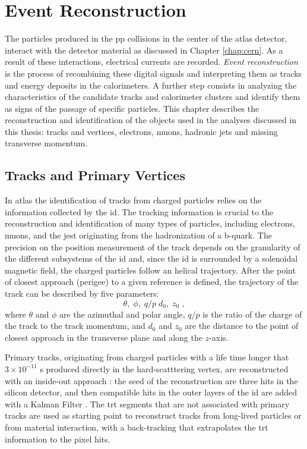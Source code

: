 \chapter{Event Reconstruction}
\label{sec:event:reco}

The particles produced in the \gls{pp} collisions in the center of the \gls{atlas} detector, interact with the detector material as discussed in Chapter \ref{chap:cern}. As a result of these interactions, electrical currents are recorded. \textit{Event reconstruction} is the process of recombining these digital signals and interpreting them as tracks and energy deposits in the calorimeters. A further step consists in analyzing the characteristics of the candidate tracks and calorimeter clusters and identify them as signs of the passage of specific particles.
This chapter describes the reconstruction and identification of the objects used in the analyses discussed in this thesis: tracks and vertices, electrons, muons, hadronic jets and missing transverse momentum. 


\section{Tracks and Primary Vertices}
\label{sec:reco:tracks}

In \gls{atlas} the identification of tracks from charged particles relies on the information collected by the \gls{id}. The tracking information is crucial to the reconstruction and identification of many types of particles, including electrons, muons, and the jest originating from the hadronization of a b-quark. The precision on the position measurement of the track depends on the granularity of the different subsystems of the \gls{id} and, since the \gls{id} is surrounded by a solenoidal magnetic field, the charged particles follow an helical trajectory. After the point of closest approach (perigee) to a given reference is defined, the trajectory of the track can be described by five parameters: 
\begin{equation}
\theta, \; \phi, \; q/p \; d_0, \; z_0 \;,
\end{equation}
\noindent where $\theta$ and $\phi$ are the azimuthal and polar angle, $q/p$ is the ratio of the charge of the track to the track momentum, and $d_0$ and $z_0$ are the distance to the point of closest approach in the transverse plane and along the $z$-axis. 

Primary tracks, originating from charged particles with a life time longer that $3 \times 10^{-11}$ s produced directly in the hard-scatttering vertex, are reconstructed with an inside-out approach \cite{Cornelissen:1020106}: the seed of the reconstruction are three hits in the silicon detector, and then compatible hits in the outer layers of the \gls{id} are added with a Kalman Filter \cite{citeulike:347166,Fruhwirth:1987fm}. The \gls{trt} segments that are not associated with primary tracks are used as starting point to reconstruct tracks from long-lived particles or from material interaction, with a back-tracking that extrapolates the \gls{trt} information to the pixel hits. 

